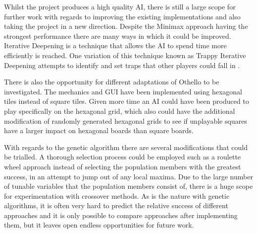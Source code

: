 \documentclass[12pt,a4paper]{article}
\begin{document}
Whilst the project produces a high quality AI, there is still a large scope for further work with regards to improving the existing implementations and also taking the project in a new direction. Despite the Minimax approach having the strongest performance there are many ways in which it could be improved. Iterative Deepening is a technique that allows the AI to spend time more efficiently is reached. One variation of this technique known as Trappy Iterative Deepening attempts to identify and set traps that other players could fall in \cite{gordon2006trappy}. 



There is also the opportunity for different adaptations of Othello to be investigated. The mechanics and GUI have been implemented using hexagonal tiles instead of square tiles. Given more time an AI could have been produced to play specifically on the hexagonal grid, which also could have the additional modification of randomly generated hexagonal grids to see if unplayable squares have a larger impact on hexagonal boards than square boards.

With regards to the genetic algorithm there are several modifications that could be trialled. A thorough selection process could be employed such as a roulette wheel approach \cite{zhang2012equal} instead of selecting the population members with the greatest success, in an attempt to jump out of any local maxima. Due to the large number of tunable variables that the population members consist of, there is a huge scope for experimentation with crossover methods. As is the nature with genetic algorithms, it is often very hard to predict the relative success of different approaches and it is only possible to compare approaches after implementing them, but it leaves open endless opportunities for future work.


\end{document}
